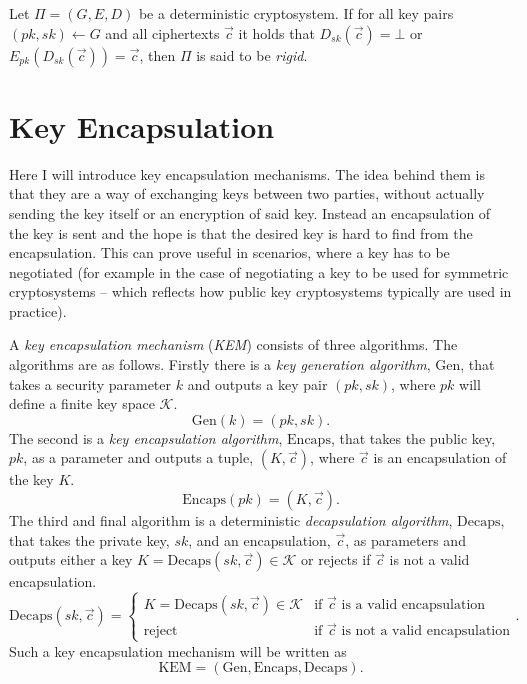 \begin{defi}
\label{def:rigCry}
	Let $\Pi = \left(G,E,D\right)$ be a deterministic cryptosystem. If for all key pairs $\left(pk, sk\right) \leftarrow G$ and all ciphertexts $\vec{c}$ it holds that $D_{sk}\left(\vec{c}\right) = \bot$ or $E_{pk} \left(D_{sk}\left(\vec{c}\right)\right) = \vec{c}$, then $\Pi$ is said to be \emph{rigid}.
\end{defi}



\section{Key Encapsulation}
\label{sec:keyEncaps}

Here I will introduce key encapsulation mechanisms. The idea behind them is that they are a way of exchanging keys between two parties, without actually sending the key itself or an encryption of said key. Instead an encapsulation of the key is sent and the hope is that the desired key is hard to find from the encapsulation. This can prove useful in scenarios, where a key has to be negotiated (for example in the case of negotiating a key to be used for symmetric cryptosystems -- which reflects how public key cryptosystems typically are used in practice).

A \emph{key encapsulation mechanism} (\emph{KEM}) consists of three algorithms. The algorithms are as follows. Firstly there is a \emph{key generation algorithm}, \emph{$\mathrm{Gen}$}, that takes a security parameter $k$ and outputs a key pair $\left(pk,sk\right)$, where $pk$ will define a finite key space $\mathcal{K}$.
\[
	\mathrm{Gen}\left(k\right) = \left(pk, sk\right).
\]
The second is a \emph{key encapsulation algorithm}, \emph{$\mathrm{Encaps}$}, that takes the public key, $pk$, as a parameter and outputs a tuple, $\left(K,\vec{c}\right)$, where $\vec{c}$ is an encapsulation of the key $K$.
\[
	\mathrm{Encaps}\left(pk\right) = \left(K, \vec{c}\right).
\]
The third and final algorithm is a deterministic \emph{decapsulation algorithm}, \emph{$\mathrm{Decaps}$}, that takes the private key, $sk$, and an encapsulation, $\vec{c}$, as parameters and outputs either a key $K = \mathrm{Decaps}\left(sk,\vec{c}\right) \in \mathcal{K}$ or rejects if $\vec{c}$ is not a valid encapsulation.
\[
	\mathrm{Decaps}\left(sk, \vec{c}\right) = \begin{cases}
		K = \mathrm{Decaps}\left(sk,\vec{c}\right) \in \mathcal{K} & \text{if $\vec{c}$ is a valid encapsulation}\\
		\text{reject} & \text{if $\vec{c}$ is not a valid encapsulation}
	\end{cases}.
\]
Such a key encapsulation mechanism will be written as
\[
	\mathrm{KEM} = \left(\mathrm{Gen}, \mathrm{Encaps}, \mathrm{Decaps}\right).
\]

